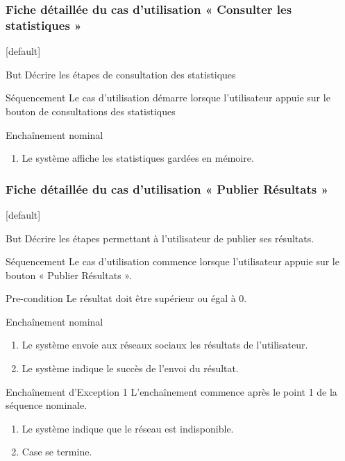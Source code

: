 \documentclass{beamer}
\begin{document}
\begin{frame}
  \frametitle{Fiche détaillée du cas d'utilisation « Consulter les statistiques »}
  [default]
  \begin{block}{\footnotesize{But}}
    \scriptsize{Décrire les étapes de consultation des statistiques}
  \end{block}
  \pause
  \begin{block}{\footnotesize{Séquencement}}
    \scriptsize{Le cas d'utilisation démarre lorsque l'utilisateur appuie sur le bouton de consultations des statistiques}
  \end{block}
  \pause
  \begin{block}{\footnotesize{Enchaînement nominal}}
    \begin{enumerate}    
      [circle]
      \item
        \scriptsize{Le système affiche les statistiques gardées en mémoire.}
    \end{enumerate}
  \pause 
  \end{block}
\end{frame}

\begin{frame}
  \frametitle{Fiche détaillée du cas d'utilisation « Publier Résultats »}
  [default]
  \begin{block}{\footnotesize{But}}
    \scriptsize{Décrire les étapes permettant à l'utilisateur de publier ses résultats.}
  \end{block}
  \pause
  \begin{block}{\footnotesize{Séquencement}}
    \scriptsize{Le cas d'utilisation commence lorsque l'utilisateur appuie sur le bouton « Publier Résultats ».}
  \end{block}
  \pause
  \begin{block}{\footnotesize{Pre-condition}}
    \scriptsize{Le résultat doit être supérieur ou égal à 0.}
  \end{block}
  \pause
  \begin{block}{\footnotesize{Enchaînement nominal}}
    \begin{enumerate}    
      [circle]
      \item
        \scriptsize{Le système envoie aux réseaux sociaux les résultats de l'utilisateur.}
      \item
        \scriptsize{Le système indique le succès de l'envoi du résultat. }
    \end{enumerate}
  \end{block}
  \pause
  \begin{block}{\footnotesize{Enchaînement d’Exception 1}}
  \scriptsize{L'enchaînement commence après le point 1 de la séquence nominale.}
    \begin{enumerate}
      \item
        \scriptsize{Le système indique que le réseau est indisponible.}
      \item
        \scriptsize{Case se termine.}
    \end{enumerate}
  \end{block}
\end{frame}
\end{document}
